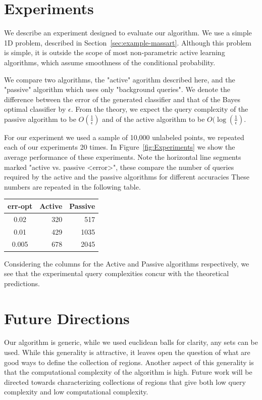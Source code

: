 \documentclass[twoside]{article}
\begin{document}
\section{Experiments}
\label{sec:experiment}
We describe an experiment designed to evaluate our algorithm.
We use a simple 1D problem, described in Section~\ref{sec:example-massart}.
Although this problem is simple, it is outside the scope of most non-parametric active learning algorithms, which assume smoothness of the conditional probability.

We compare two algorithms, the "active" agorithm described here, and the "passive" algorithm which uses only "background queries". We denote the difference between the error of the generated classifier and that of the Bayes optimal classifier by $\epsilon$. From the theory, we expect the query complexity of the passive algorithm to be $O(\frac{1}{\epsilon})$ and of the active algorithm to be $O(\log (\frac{1}{\epsilon})$. 


 For our experiment we used a sample of 10,000 unlabeled points, we repeated each of our experiments 20 times. In Figure~\ref{fig:Experiments} we show the average performance of these experiments. Note the horizontal line segments marked "active vs. passive <error>", these compare the number of queries required by the active and the passive algorithms for different accuracies
 These numbers are repeated in the following table.
\begin{center}
\begin{tabular}{|c|rr|}
\hline
err-opt &  Active&  Passive \\
\hline
0.02  &    320 &     517 \\
0.01 &     429 &    1035 \\
0.005 &678 &    2045 \\
\hline
\end{tabular}
\end{center}

Considering the columns for the Active and Passive algorithms respectively, we see that the experimental query complexities concur with the theoretical predictions.

\section{Future Directions}
Our algorithm is generic, while we used euclidean balls for clarity,
any sets can be used. While this generality is attractive, it leaves
open the question of what are good ways to define the collection of
regions. Another aspect of this generality is that the computational
complexity of the algorithm is high. Future work will be directed
towards characterizing collections of regions that give both low query
complexity and low computational complexity.
\end{document}
